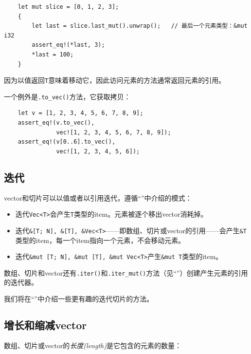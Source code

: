 \begin{verbatim}
    let mut slice = [0, 1, 2, 3];
    {
        let last = slice.last_mut().unwrap();   // 最后一个元素类型：&mut i32
        assert_eq!(*last, 3);
        *last = 100;
    }
\end{verbatim}

因为以值返回\texttt{T}意味着移动它，因此访问元素的方法通常返回元素的引用。

一个例外是\texttt{.to\_vec()}方法，它获取拷贝：

\begin{verbatim}
    let v = [1, 2, 3, 4, 5, 6, 7, 8, 9];
    assert_eq!(v.to_vec(),
               vec![1, 2, 3, 4, 5, 6, 7, 8, 9]);
    assert_eq!(v[0..6].to_vec(),
               vec![1, 2, 3, 4, 5, 6]);
\end{verbatim}

\subsection{迭代}\label{Iteration}
vector和切片可以以值或者以引用迭代，遵循“”中介绍的模式：
\begin{itemize}
    \item 迭代\texttt{Vec<T>}会产生\texttt{T}类型的item。元素被逐个移出vector消耗掉。
    \item 迭代\texttt{\&[T; N], \&[T], \&Vec<T>}——即数组、切片或vector的引用——会产生\texttt{\&T}类型的item，每一个item指向一个元素，不会移动元素。
    \item 迭代\texttt{\&mut [T; N], \&mut [T], \&mut Vec<T>}产生\texttt{\&mut T}类型的item。
\end{itemize}

数组、切片和vector还有\texttt{.iter()}和\texttt{.iter\_mut()}方法（见“”）创建产生元素的引用的迭代器。

我们将在“”中介绍一些更有趣的迭代切片的方法。

\subsection{增长和缩减vector}
数组、切片或vector的\emph{长度(length)}是它包含的元素的数量：


